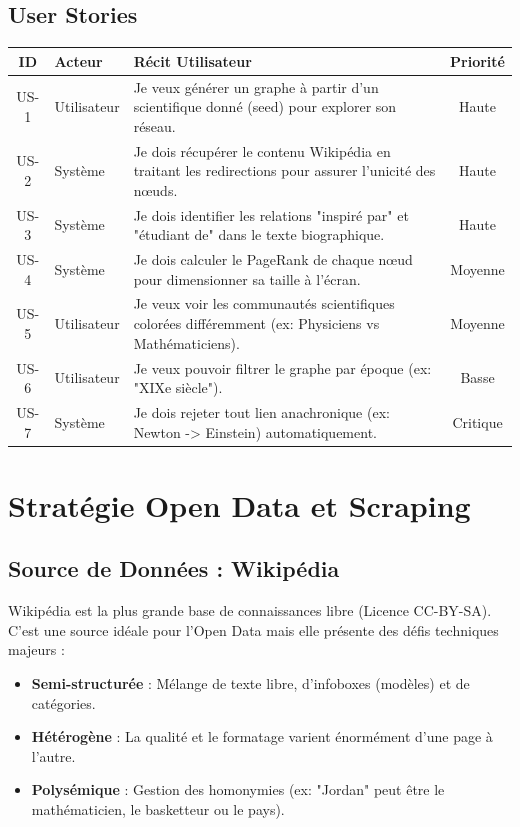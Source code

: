 \documentclass[12pt,a4paper]{report}
\begin{document}
\section{User Stories}

\begin{longtable}{|c|p{3cm}|p{8cm}|c|}
\hline
\rowcolor{indigo!20}
\textbf{ID} & \textbf{Acteur} & \textbf{Récit Utilisateur} & \textbf{Priorité} \\
\hline
US-1 & Utilisateur & Je veux générer un graphe à partir d'un scientifique donné (seed) pour explorer son réseau. & Haute \\
\hline
US-2 & Système & Je dois récupérer le contenu Wikipédia en traitant les redirections pour assurer l'unicité des nœuds. & Haute \\
\hline
US-3 & Système & Je dois identifier les relations "inspiré par" et "étudiant de" dans le texte biographique. & Haute \\
\hline
US-4 & Système & Je dois calculer le PageRank de chaque nœud pour dimensionner sa taille à l'écran. & Moyenne \\
\hline
US-5 & Utilisateur & Je veux voir les communautés scientifiques colorées différemment (ex: Physiciens vs Mathématiciens). & Moyenne \\
\hline
US-6 & Utilisateur & Je veux pouvoir filtrer le graphe par époque (ex: "XIXe siècle"). & Basse \\
\hline
US-7 & Système & Je dois rejeter tout lien anachronique (ex: Newton -> Einstein) automatiquement. & Critique \\
\hline
\end{longtable}

\chapter{Stratégie Open Data et Scraping}

\section{Source de Données : Wikipédia}
Wikipédia est la plus grande base de connaissances libre (Licence CC-BY-SA). C'est une source idéale pour l'Open Data mais elle présente des défis techniques majeurs :
\begin{itemize}
    \item \textbf{Semi-structurée} : Mélange de texte libre, d'infoboxes (modèles) et de catégories.
    \item \textbf{Hétérogène} : La qualité et le formatage varient énormément d'une page à l'autre.
    \item \textbf{Polysémique} : Gestion des homonymies (ex: "Jordan" peut être le mathématicien, le basketteur ou le pays).
\end{itemize}
\end{document}
